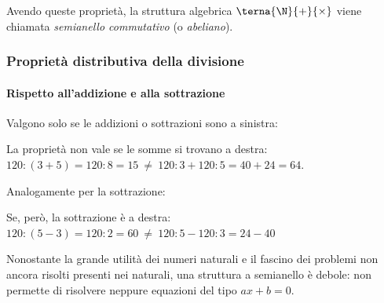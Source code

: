 Avendo queste proprietà, la struttura algebrica 
\(\terna{\N}{+}{\times}\)\indc{\(\N\)}{\(\terna{\N}{+}{\times}\)} 
viene chiamata \emph{semianello commutativo} (o \emph{abeliano}).


\subsubsection{Proprietà distributiva della divisione}

\paragraph{Rispetto all'addizione e alla sottrazione}

Valgono solo se le addizioni o sottrazioni sono a sinistra:


La proprietà non vale se le somme si trovano a destra:\\
\(120 : (3 + 5) = 120 : 8 = 15 ~\neq~ 
  120 : 3 + 120 : 5 = 40 + 24 = 64\).

Analogamente per la sottrazione:


Se, però, la sottrazione è a destra:\\
\(120 : (5 - 3) = 120 : 2 = 60 ~\neq~ 
  120 : 5 - 120 : 3 = 24 - 40\)

\begin{osservazione}{}{}
Nonostante la grande utilità dei numeri naturali e il fascino dei 
problemi non ancora risolti presenti nei naturali, 
una struttura a semianello è debole:
non permette di risolvere neppure equazioni del tipo \(ax + b = 0\).
\end{osservazione}


% 

